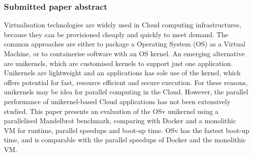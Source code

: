 \subsubsection{Submitted paper abstract}
Virtualisation technologies are widely used in Cloud computing
infrastructures, because they can be provisioned cheaply and quickly
to meet demand. The common approaches are either to package a
Operating System (OS) as a Virtual Machine, or to containerise
software with an OS kernel. An emerging alternative are unikernels,
which are customised kernels to support just one application.
Unikernels are lightweight and an applications has sole use of the
kernel, which offers potential for fast, resource efficient and
secure execution. For these reasons, unikernels may be idea for
parallel computing in the Cloud. However, the parallel performance
of unikernel-based Cloud applications has not been extensively
studied.
This paper presents an evaluation of the OSv unikernel using a
parallelised Mandelbrot benchmark, comparing with Docker and a
monolithic VM for runtime, parallel speedups and boot-up time. OSv
has the fastest boot-up time, and is comparable with the parallel
speedups of Docker and the monolithic VM.



